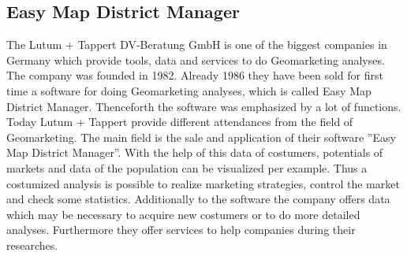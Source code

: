 \subsection{Easy Map District Manager}
The Lutum + Tappert DV-Beratung GmbH is one of the biggest companies in Germany which provide tools, data and services to do Geomarketing analyses. The company was founded in 1982. Already 1986 they have been sold for first time a software for doing Geomarketing analyses, which is called Easy Map District Manager. Thenceforth the software was emphasized by a lot of functions. Today Lutum + Tappert provide different attendances from the field of Geomarketing. The main field is the sale and application of their software ''Easy Map District Manager''. With the help of this data of costumers, potentials of markets and data of the population can be visualized per example. Thus a costumized analysis is possible to realize marketing strategies, control the market and check some statistics. Additionally to the software the company offers data which may be necessary to acquire new costumers or to do more detailed analyses. Furthermore they offer services to help companies during their researches. \\
